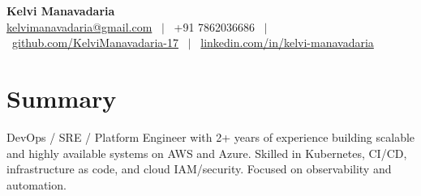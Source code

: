 \documentclass[a4paper,10.999999pt]{article}
\begin{document}
    
    \pagestyle{empty}
    
    
    
    \begin{center}
    \LARGE{\textbf{Kelvi Manavadaria}} \\[1.5pt]
    {\small
    \href{mailto:kelvimanavadaria@gmail.com}{kelvimanavadaria@gmail.com} \ $|$ \
    +91 7862036686 \ $|$ \
    \href{https://github.com/KelviManavadaria-17}{github.com/KelviManavadaria-17} \ $|$ \
    \href{https://www.linkedin.com/in/kelvi-manavadaria/}{linkedin.com/in/kelvi-manavadaria}
    }
    \end{center}

    \vspace{0.5pt}


    \section{Summary}
DevOps / SRE / Platform Engineer with 2+ years of experience building scalable and highly available systems on AWS and Azure. Skilled
in Kubernetes, CI/CD, infrastructure as code, and cloud IAM/security. Focused on observability and automation.

\end{document}
